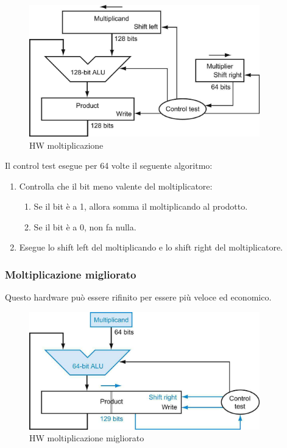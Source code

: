 \begin{figure}[H]
    \centering
    \includegraphics[width=100mm,scale=1.5]{pictures/schemaMoltiplicazione.png}
    \caption{HW moltiplicazione}
    \label{fig:hw-multiplication}
\end{figure}
\newpage
Il control test esegue per 64 volte il seguente algoritmo:
\begin{enumerate}
    \item Controlla che il bit meno valente del moltiplicatore:
    \begin{enumerate}
        \item Se il bit è a 1, allora somma il moltiplicando al prodotto.
        \item Se il bit è a 0, non fa nulla.
    \end{enumerate}
    \item Esegue lo shift left del moltiplicando e lo shift right del moltiplicatore.
\end{enumerate}


\subsubsection{Moltiplicazione migliorato}
Questo hardware può essere rifinito per essere più veloce ed economico.

\begin{figure}[H]
    \centering
    \includegraphics[width=100mm,scale=1.5]{pictures/schemaMoltiplicazioneVeloce.png}
    \caption{HW moltiplicazione migliorato}
    \label{fig:hw-multiplication-improved}
\end{figure}

